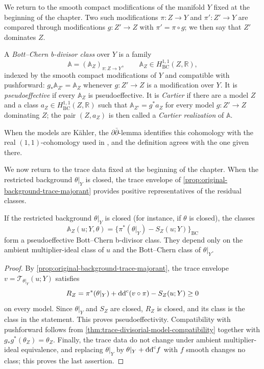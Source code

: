 We return to the smooth compact modifications of the manifold $Y$ fixed at the beginning of the chapter. Two such modifications $\pi\colon Z\to Y$ and $\pi'\colon Z'\to Y$ are compared through modifications $g\colon Z'\to Z$ with $\pi'=\pi\circ g$; we then say that $Z'$ dominates $Z$.

\begin{definition}\label{def:bott-chern-bdivisor-class}
A \emph{Bott--Chern b-divisor class} over $Y$ is a family
\[
 \mathbb A=(\mathbb A_Z)_{\pi\colon Z\to Y},\qquad
 \mathbb A_Z\in H^{1,1}_{\mathrm{BC}}(Z,\mathbb R),
\]
indexed by the smooth compact modifications of $Y$ and compatible with pushforward: $g_*\mathbb A_{Z'}=\mathbb A_Z$ whenever $g\colon Z'\to Z$ is a modification over $Y$. It is \emph{pseudoeffective} if every $\mathbb A_Z$ is pseudoeffective. It is \emph{Cartier} if there are a model $Z$ and a class $a_Z\in H^{1,1}_{\mathrm{BC}}(Z,\mathbb R)$ such that $\mathbb A_{Z'}=g^*a_Z$ for every model $g\colon Z'\to Z$ dominating $Z$; the pair $(Z,a_Z)$ is then called a \emph{Cartier realization} of $\mathbb A$.
\end{definition}

When the models are K\"ahler, the $\partial\bar\partial$-lemma identifies this cohomology with the real $(1,1)$-cohomology used in \cite[Section~11.1]{SGPT}, and the definition agrees with the one given there.

We now return to the trace data fixed at the beginning of the chapter. When the restricted background $\theta|_Y$ is closed, the trace envelope of \cref{prop:original-background-trace-majorant} provides positive representatives of the residual classes.

\begin{proposition}\label{prop:trace-bott-chern-bclass}
If the restricted background $\theta|_Y$ is closed (for instance, if $\theta$ is closed), the classes
\[
 \mathbb A_Z(u;Y,\theta)
 =\{\pi^*(\theta|_Y)-S_Z(u;Y)\}_{\mathrm{BC}}
\]
form a pseudoeffective Bott--Chern b-divisor class. They depend only on the ambient multiplier-ideal class of $u$ and the Bott--Chern class of $\theta|_Y$.
\end{proposition}
\begin{proof}
By \cref{prop:original-background-trace-majorant}, the trace envelope $v=\mathcal T_{\theta|_Y}(u;Y)$ satisfies
\[
 R_Z=\pi^*(\theta|_Y)+\mathrm{dd}^{\mathrm{c}}(v\circ\pi)-S_Z(u;Y)\geq0
\]
on every model. Since $\theta|_Y$ and $S_Z$ are closed, $R_Z$ is closed, and its class is the class in the statement. This proves pseudoeffectivity. Compatibility with pushforward follows from \cref{thm:trace-divisorial-model-compatibility} together with $g_*g^*(\theta_Z)=\theta_Z$. Finally, the trace data do not change under ambient multiplier-ideal equivalence, and replacing $\theta|_Y$ by $\theta|_Y+\mathrm{dd}^{\mathrm{c}} f$ with $f$ smooth changes no class; this proves the last assertion.
\end{proof}

